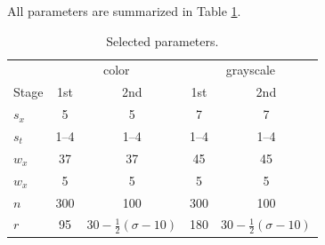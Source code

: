 \documentclass[10pt, a4paper]{article}
\begin{document}
All parameters are summarized in Table \ref{tab:parameters}.

%


\begin{table}
	\centering
	\begin{tabular}{l | c c | c c }
		& \multicolumn{2}{c|}{color} 
		& \multicolumn{2}{c}{grayscale}\\
		Stage                            & 1st    & 2nd   & 1st   & 2nd   \\\hline\hline
		$s_x$        &  5 & 5 & 7 & 7 \\
		$s_t$        &  1--4  & 1--4  & 1--4  & 1--4  \\
		$w_x$        &  37    & 37    & 45    & 45    \\
		$w_x$        &   5    & 5     & 5     & 5    \\
		$n$          & 300    & 100   & 300   & 100  \\
		$r$          & 95   & $30 - \frac12(\sigma - 10)$    & 180  & $30 - \frac12(\sigma - 10)$   \\
	\end{tabular}
	\caption{Selected parameters.}
	\label{tab:parameters}
\end{table}
\end{document}
